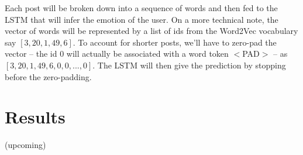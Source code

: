 Each post will be broken down into a sequence of words and then fed to the LSTM that will infer the emotion of the user. On a more technical note, the vector of words will be represented by a list of ids from the Word2Vec vocabulary say $[3, 20, 1, 49, 6]$. To account for shorter posts, we'll have to zero-pad the vector -- the id 0 will actually be associated with a word token $<$PAD$>$ -- as $[3, 20, 1, 49, 6, 0, 0, ..., 0]$. The LSTM will then give the prediction by stopping before the zero-padding.

\section{Results}
(upcoming)







